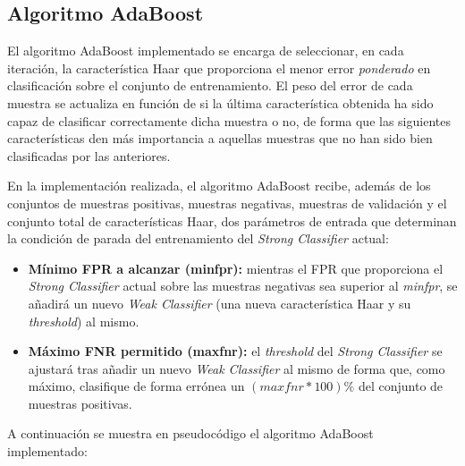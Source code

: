 \documentclass[11pt,spanish,a4paper]{article} %
\begin{document}
\subsection{Algoritmo AdaBoost}

El algoritmo AdaBoost implementado se encarga de seleccionar, en cada iteración, la característica Haar que proporciona el menor error \textit{ponderado} en clasificación sobre el conjunto de entrenamiento. El peso del error de cada muestra se actualiza en función de si la última característica obtenida ha sido capaz de clasificar correctamente dicha muestra o no, de forma que las siguientes características den más importancia a aquellas muestras que no han sido bien clasificadas por las anteriores.

En la implementación realizada, el algoritmo AdaBoost recibe, además de los conjuntos de muestras positivas, muestras negativas, muestras de validación y el conjunto total de características Haar, dos parámetros de entrada que determinan la condición de parada del entrenamiento del \textit{Strong Classifier} actual:

\begin{itemize}
\item \textbf{Mínimo FPR a alcanzar (minfpr):} mientras el FPR que proporciona el \textit{Strong Classifier} actual sobre las muestras negativas sea superior al \textit{minfpr}, se añadirá un nuevo \textit{Weak Classifier} (una nueva característica Haar y su \textit{threshold}) al mismo.
\item \textbf{Máximo FNR permitido (maxfnr):} el \textit{threshold} del \textit{Strong Classifier} se ajustará tras añadir un nuevo \textit{Weak Classifier} al mismo de forma que, como máximo, clasifique de forma errónea un $(maxfnr*100)\%$ del conjunto de muestras positivas.
\end{itemize}

A continuación se muestra en pseudocódigo el algoritmo AdaBoost implementado:
\end{document}
